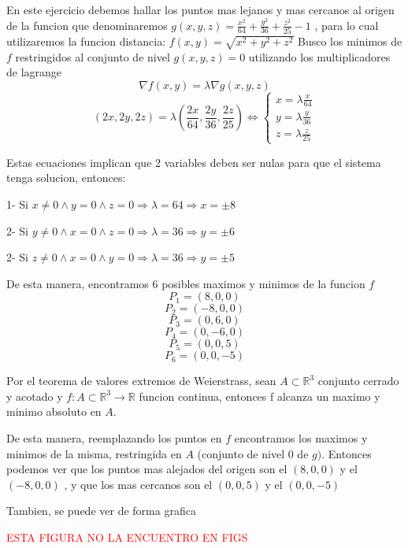 \begin{solution}
    En este ejercicio debemos hallar los puntos mas lejanos y mas cercanos al origen de la funcion que denominaremos $g(x,y,z)=\frac{x^2}{64}+\frac{y^2}{36}+\frac{z^2}{25}-1$ , para lo cual utilizaremos la funcion distancia: $f(x,y)=\sqrt{x^2+y^2+z^2}$ \newline Busco los minimos de $f$ restringidos al conjunto de nivel $g(x,y,z)=0$ utilizando los multiplicadores de lagrange
\[
        \nabla f(x,y)=\lambda \nabla g(x,y,z)
    \]
    \[
        (2x,2y,2z)=\lambda (\frac{2x}{64},\frac{2y}{36},\frac{2z}{25}) \iff \begin{cases}
            x = \lambda\frac{x}{64}\\
            y = \lambda\frac{y}{36}\\
            z = \lambda\frac{z}{25}
        \end{cases}
    \]
    
    Estas ecuaciones implican que 2 variables deben ser nulas para que el sistema tenga solucion, entonces:

1- Si $x\neq 0 \land y=0 \land z=0 \Rightarrow \lambda=64  \Rightarrow x=\pm 8$ 

2- Si $y\neq 0 \land x=0 \land z=0 \Rightarrow \lambda=36  \Rightarrow y=\pm 6$ 

2- Si $z\neq 0 \land x=0 \land y=0 \Rightarrow \lambda=36  \Rightarrow y=\pm 5$ 

    De esta manera, encontramos 6 posibles maximos y minimos de la funcion $f$
\[
        P_1=(8,0,0) 
         \]
         \[
        P_2=(-8,0,0) 
         \]
        \[
        P_3=(0,6,0) 
         \]
         \[
        P_4=(0,-6,0) 
         \]
         \[
        P_5=(0,0,5) 
         \]
         \[
        P_6=(0,0,-5) 
    \]
    
    Por el teorema de valores extremos de Weierstrass, sean $A \subset \mathbb{R}^3$ conjunto cerrado y acotado y $f:A\subset\mathbb{R}^3\rightarrow\mathbb{R} $ funcion continua, entonces f alcanza un maximo y minimo absoluto en $A$.
    
    De esta manera, reemplazando los puntos en $f$ encontramos los maximos y minimos de la misma, restringida en $A$ (conjunto de nivel 0 de $g)$. Entonces podemos ver que los puntos mas alejados del origen son el $(8,0,0)$ y el $(-8,0,0)$ , y que los mas cercanos son el $(0,0,5)$  y el $(0,0,-5)$ \newline
    
    Tambien, se puede ver de forma grafica

    \textcolor{red}{ESTA FIGURA NO LA ENCUENTRO EN FIGS}

\end{solution}



